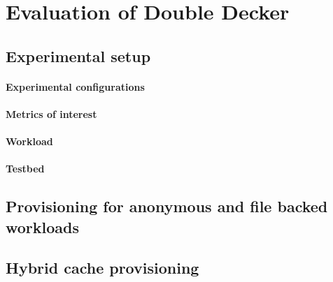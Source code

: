   
  
  \section{Evaluation of Double Decker}
  
    \subsection{Experimental setup}
	
	\paragraph{Experimental configurations}
	
	\paragraph{Metrics of interest}
	
	\paragraph{Workload}
	
	\paragraph{Testbed}
  
  
    \subsection{Provisioning for anonymous and file backed workloads}
    
    \subsection{Hybrid cache provisioning}
    